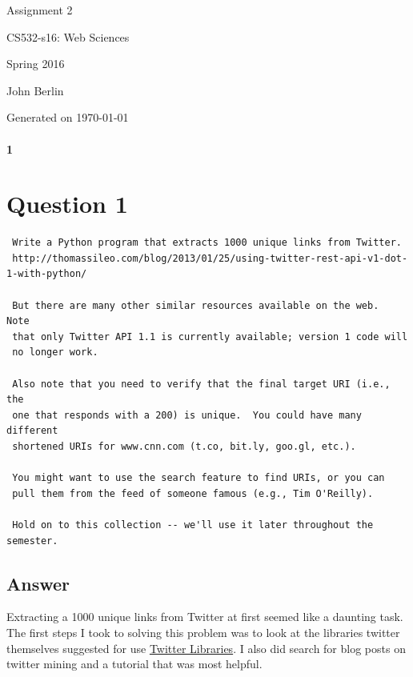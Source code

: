 \documentclass[letterpaper,10pt]{article}
\begin{document}
 

\begin{titlepage}

\begin{center}

\Huge{Assignment 2}

\Large{CS532-s16:  Web Sciences}

\Large{Spring 2016}

\Large{John Berlin}

\Large Generated on \today

\end{center}

\end{titlepage}
\paragraph{1}
\newpage

\section*{Question 1}
\begin{verbatim}
 Write a Python program that extracts 1000 unique links from Twitter.
 http://thomassileo.com/blog/2013/01/25/using-twitter-rest-api-v1-dot-1-with-python/

 But there are many other similar resources available on the web.  Note
 that only Twitter API 1.1 is currently available; version 1 code will
 no longer work.

 Also note that you need to verify that the final target URI (i.e., the
 one that responds with a 200) is unique.  You could have many different
 shortened URIs for www.cnn.com (t.co, bit.ly, goo.gl, etc.).

 You might want to use the search feature to find URIs, or you can
 pull them from the feed of someone famous (e.g., Tim O'Reilly).

 Hold on to this collection -- we'll use it later throughout the semester. 
\end{verbatim}
\subsection*{Answer}

Extracting a 1000 unique links from Twitter at first seemed like a daunting task. The first steps I took to solving this problem was to look at the libraries twitter themselves suggested for use \href{https://dev.twitter.com/overview/api/twitter-libraries}{Twitter Libraries}. I also did search for blog posts on twitter mining and a tutorial that was most helpful.
\end{document}
